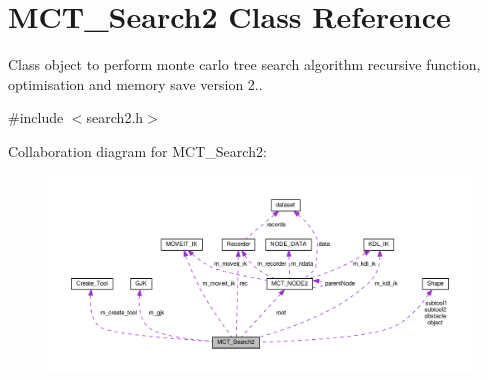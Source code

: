 \hypertarget{classMCT__Search2}{}\section{M\+C\+T\+\_\+\+Search2 Class Reference}
\label{classMCT__Search2}


Class object to perform monte carlo tree search algorithm recursive function, optimisation and memory save version 2..  




{\ttfamily \#include $<$search2.\+h$>$}



Collaboration diagram for M\+C\+T\+\_\+\+Search2\+:
\nopagebreak
\begin{figure}[H]
\begin{center}
\leavevmode
\includegraphics[width=350pt]{classMCT__Search2__coll__graph}
\end{center}
\end{figure}

